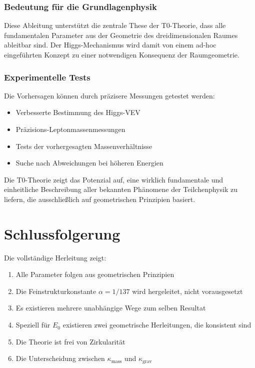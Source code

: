 \subsubsection{Bedeutung für die Grundlagenphysik}

Diese Ableitung unterstützt die zentrale These der T0-Theorie, dass alle fundamentalen Parameter aus der Geometrie des dreidimensionalen Raumes ableitbar sind. Der Higgs-Mechanismus wird damit von einem ad-hoc eingeführten Konzept zu einer notwendigen Konsequenz der Raumgeometrie.

\subsubsection{Experimentelle Tests}

Die Vorhersagen können durch präzisere Messungen getestet werden:

\begin{itemize}
	\item Verbesserte Bestimmung des Higgs-VEV
	\item Präzisions-Leptonmassenmessungen
	\item Tests der vorhergesagten Massenverhältnisse
	\item Suche nach Abweichungen bei höheren Energien
\end{itemize}

Die T0-Theorie zeigt das Potenzial auf, eine wirklich fundamentale und einheitliche Beschreibung aller bekannten Phänomene der Teilchenphysik zu liefern, die ausschließlich auf geometrischen Prinzipien basiert.

	\section{Schlussfolgerung}
	
	Die vollständige Herleitung zeigt:
	\begin{enumerate}
		\item Alle Parameter folgen aus geometrischen Prinzipien
		\item Die Feinstrukturkonstante $\alpha = 1/137$ wird hergeleitet, nicht vorausgesetzt
		\item Es existieren mehrere unabhängige Wege zum selben Resultat
		\item Speziell für $E_0$ existieren zwei geometrische Herleitungen, die konsistent sind
		\item Die Theorie ist frei von Zirkularität
		\item Die Unterscheidung zwischen $\kappa_{\text{mass}}$ und $\kappa_{\text{grav}}$
	\end{enumerate}
	
